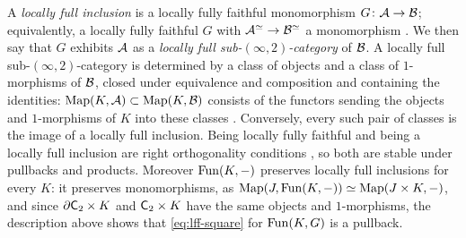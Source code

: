 %
A \emph{locally full inclusion} is a locally fully faithful monomorphism
$G\colon \mathcal{A} \to \mathcal{B}$; equivalently, a locally fully faithful $G$ with
$\mathcal{A}^{\simeq} \to \mathcal{B}^{\simeq}$
a monomorphism \cite[Def.~2.6.3,
Prop.~2.6.17]{abellangagnahaugseng2024straightening}.
We then say that $G$ exhibits $\mathcal{A}$ as a \emph{locally full
sub-$(\infty,2)$-category} of $\mathcal{B}$. A locally full sub-$(\infty,2)$-category is
determined by a class of objects and a class of $1$-morphisms of $\mathcal{B}$,
closed under equivalence and composition and containing the identities:
$\operatorname{Map}(K,\mathcal{A}) \subset \operatorname{Map}(K,\mathcal{B})$
consists of the functors sending the objects and $1$-morphisms of $K$ into these
classes \cite[Cor.~2.6.6]{abellangagnahaugseng2024straightening}. Conversely,
every such pair of classes is the image of a locally full inclusion.
Being locally fully faithful and being a locally full inclusion are right
orthogonality conditions \cite[Prop.~2.6.5,
Cor.~2.6.7]{abellangagnahaugseng2024straightening},
so both are stable under pullbacks and products.
Moreover $\operatorname{Fun}(K,-)$ preserves locally full inclusions for every $K$:
it preserves monomorphisms, as
$\operatorname{Map}(J,\operatorname{Fun}(K,-)) \simeq \operatorname{Map}(J \times K,-)$,
and since $\partial\mathsf{C}_{2} \times K$ and $\mathsf{C}_{2} \times K$ have the same objects and
$1$-morphisms, the description above shows that \eqref{eq:lff-square} for
$\operatorname{Fun}(K,G)$ is a pullback.
